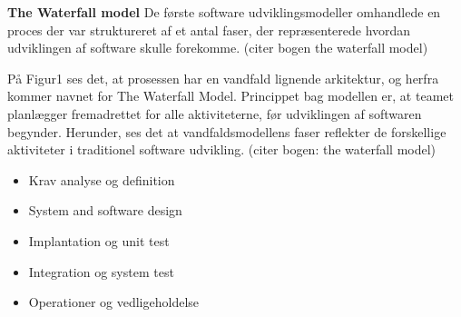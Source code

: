 \textbf{The Waterfall model}
De første software udviklingsmodeller omhandlede en proces der var struktureret af et antal faser, der repræsenterede hvordan udviklingen af software skulle forekomme. (citer bogen the waterfall model)


På Figur1 ses det, at prosessen har en vandfald lignende arkitektur, og herfra kommer navnet for The Waterfall Model. Princippet bag modellen er, at teamet planlægger fremadrettet for alle aktiviteterne, før udviklingen af softwaren begynder. Herunder, ses det at vandfaldsmodellens faser reflekter de forskellige aktiviteter i traditionel software udvikling.\cite{waterfall} (citer bogen: the waterfall model)
\begin{itemize}
    \item Krav analyse og definition 
    \item System and software design
    \item Implantation og unit test
    \item Integration og system test 
    \item Operationer og vedligeholdelse 
\end{itemize}

